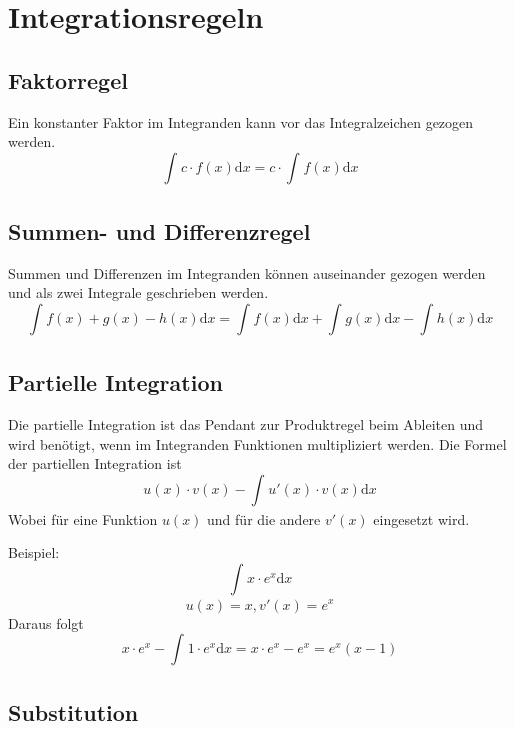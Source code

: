 \documentclass{article}
\author{Philipp Kiss}
\begin{document}
\section{Integrationsregeln}
\subsection{Faktorregel}
Ein konstanter Faktor im Integranden kann vor das Integralzeichen gezogen werden.
$$ \int_{}^{} c \cdot f(x) \mathrm{d}x = c \cdot \int_{}^{} f(x) \mathrm{d}x $$
\subsection{Summen- und Differenzregel}
Summen und Differenzen im Integranden können auseinander gezogen werden und als zwei Integrale geschrieben werden.
$$ \int_{}^{} f(x) + g(x) - h(x) \mathrm{d}x = \int_{}^{} f(x) \mathrm{d}x + \int_{}^{} g(x) \mathrm{d}x - \int_{}^{} h(x) \mathrm{d}x $$

\subsection{Partielle Integration}
Die partielle Integration ist das Pendant zur Produktregel beim Ableiten und wird benötigt, wenn im Integranden Funktionen multipliziert werden. Die Formel der partiellen Integration ist
$$u(x) \cdot v(x) - \int_{}^{} u'(x) \cdot v(x) \mathrm{d}x $$
Wobei für eine Funktion $u(x)$ und für die andere $v'(x)$ eingesetzt wird.

Beispiel:
$$ \int_{}^{} x \cdot e^{x} \mathrm{d}x $$
$$u(x) = x, v'(x) = e^{x}$$
Daraus folgt
$$x \cdot e^{x} - \int_{}^{} 1 \cdot e^{x} \mathrm{d}x = x \cdot e^{x} - e^{x} = e^{x}(x-1)$$

\subsection{Substitution}
\end{document}
